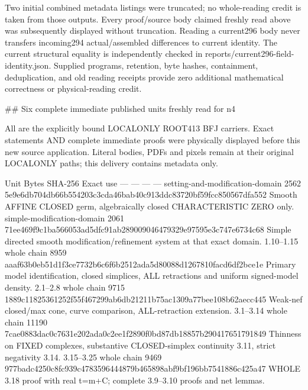 \documentclass[11pt]{article}
\begin{document}
Two initial combined metadata listings were truncated; no whole-reading credit is taken from those outputs. Every proof/source body claimed freshly read above was subsequently displayed without truncation. Reading a current296 body never transfers incoming294 actual/assembled differences to current identity. The current structural equality is independently checked in reports/current296-field-identity.json. Supplied programs, retention, byte hashes, containment, deduplication, and old reading receipts provide zero additional mathematical correctness or physical-reading credit.

\#\# Six complete immediate published units freshly read for n4

All are the explicitly bound LOCALONLY ROOT413 BFJ carriers. Exact statements AND complete immediate proofs were physically displayed before this new source application. Literal bodies, PDFs and pixels remain at their original LOCALONLY paths; this delivery contains metadata only.

\textbar{} Unit \textbar{} Bytes \textbar{} SHA-256 \textbar{} Exact use \textbar{}
\textbar{} --- \textbar{} --- \textbar{} --- \textbar{} --- \textbar{}
\textbar{} setting-and-modification-domain \textbar{} 2562 \textbar{} 5e9e6db704db66b554203c3cda46bab40c913ddc83720bf59fcc850567dfa552 \textbar{} Smooth AFFINE CLOSED germ, algebraically closed CHARACTERISTIC ZERO only. \textbar{}
\textbar{} simple-modification-domain \textbar{} 2061 \textbar{} 71ee469f9c1ba566053ad5dfc91ab289009046479329e97595e3c747e6734c68 \textbar{} Simple directed smooth modification/refinement system at that exact domain. \textbar{}
\textbar{} 1.10--1.15 whole chain \textbar{} 8959 \textbar{} aaaf63b0eb51d1f3ce7732b6c6f6b2512ada5d80088d1267810facd6df2bce1e \textbar{} Primary model identification, closed simplices, ALL retractions and uniform signed-model density. \textbar{}
\textbar{} 2.1--2.8 whole chain \textbar{} 9715 \textbar{} 1889c11825361252f55f467299ab6db21211b75ac1309a77bee108b62aecc445 \textbar{} Weak-nef closed/max cone, curve comparison, ALL-retraction extension. \textbar{}
\textbar{} 3.1--3.14 whole chain \textbar{} 11190 \textbar{} 7cae0883dac0c7631e202ada0c2ee1f2890f0bd87db18857b290417651791849 \textbar{} Thinness on FIXED complexes, substantive CLOSED-simplex continuity 3.11, strict negativity 3.14. \textbar{}
\textbar{} 3.15--3.25 whole chain \textbar{} 9469 \textbar{} 977badc4250c8fc939c4783596444879b465898abf9bf196bb7541886c425a47 \textbar{} WHOLE 3.18 proof with real t=m+C; complete 3.9--3.10 proofs and net lemmas. \textbar{}
\end{document}
